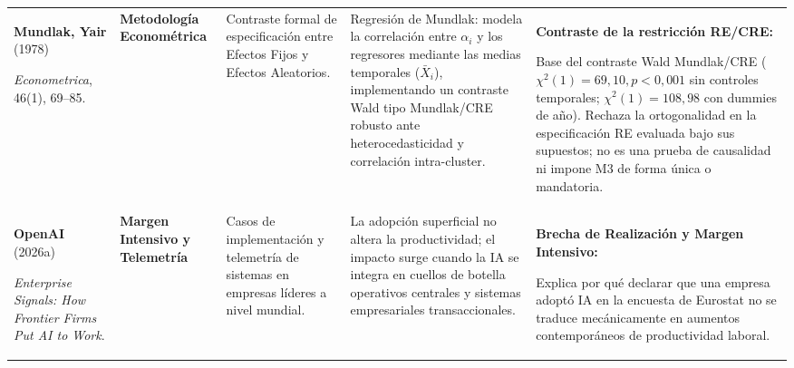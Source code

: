 \documentclass[10pt,a4paper,landscape]{article}
\begin{document}
\begin{xltabular}{\textwidth}{@{} L{4.5cm} L{3.3cm} Y Y Y @{}}
  \textbf{Mundlak, Yair} (1978)\par
  \textit{Econometrica}, 46(1), 69--85.\par
  [\texttt{mundlak1978pooling}] &
  \textbf{Metodología Econométrica} &
  Contraste formal de especificación entre Efectos Fijos y Efectos Aleatorios. &
  Regresión de Mundlak: modela la correlación entre $\alpha_i$ y los regresores mediante las medias temporales ($\bar{X}_i$), implementando un contraste Wald tipo Mundlak/CRE robusto ante heterocedasticidad y correlación intra-cluster. &
  \textbf{Contraste de la restricción RE/CRE:}\par
  Base del contraste Wald Mundlak/CRE ($\chi^2(1) = 69{,}10, p < 0{,}001$ sin controles temporales; $\chi^2(1) = 108{,}98$ con dummies de año). Rechaza la ortogonalidad en la especificación RE evaluada bajo sus supuestos; no es una prueba de causalidad ni impone M3 de forma única o mandatoria. \\
  \textbf{OpenAI} (2026a)\par
  \textit{Enterprise Signals: How Frontier Firms Put AI to Work}.\par
  [\texttt{openai2026enterprise}] &
  \textbf{Margen Intensivo y Telemetría} &
  Casos de implementación y telemetría de sistemas en empresas líderes a nivel mundial. &
  La adopción superficial no altera la productividad; el impacto surge cuando la IA se integra en cuellos de botella operativos centrales y sistemas empresariales transaccionales. &
  \textbf{Brecha de Realización y Margen Intensivo:}\par
  Explica por qué declarar que una empresa adoptó IA en la encuesta de Eurostat no se traduce mecánicamente en aumentos contemporáneos de productividad laboral. \\


\end{xltabular}
\end{document}
